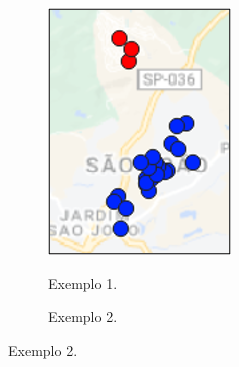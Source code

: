 \begin{figure}[H]
    \centering
     \caption{Exemplos de rotas segregadas entre marginais e não-marginais.}
     \begin{subfigure}{.3\textwidth}
         \centering
         \caption{Exemplo 1.}
         \includegraphics[height=1.2\textwidth]{images/4_materiais/compactacao/CompactacaoExemplo1.png}
         \label{fig:AMBEV_Compac_1}
     \end{subfigure}
     \begin{subfigure}{.3\textwidth}
       \centering
       \caption{Exemplo 2.}

\end{subfigure}
\end{figure}
